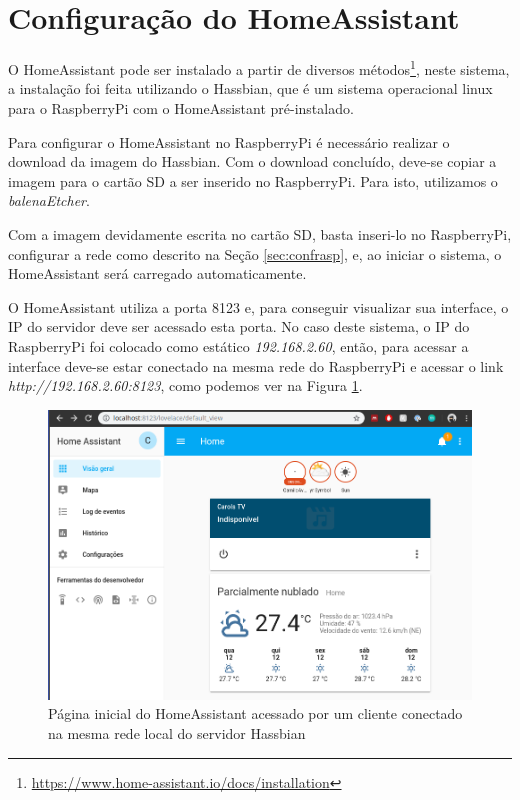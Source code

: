 \newpage

\section{Configuração do HomeAssistant}

O HomeAssistant pode ser instalado a partir de diversos métodos\footnote{\url{https://www.home-assistant.io/docs/installation}}, neste sistema, a instalação foi feita utilizando o Hassbian, que é um sistema operacional linux para o RaspberryPi com o HomeAssistant pré-instalado.

Para configurar o HomeAssistant no RaspberryPi é necessário realizar o download da imagem do Hassbian. Com o download concluído, deve-se copiar a imagem para o cartão SD a ser inserido no RaspberryPi. Para isto, utilizamos o \textit{balenaEtcher}.

Com a imagem devidamente escrita no cartão SD, basta inseri-lo no RaspberryPi, configurar a rede como descrito na Seção \ref{sec:confrasp}, e, ao iniciar o sistema, o HomeAssistant será carregado automaticamente.

O HomeAssistant utiliza a porta 8123 e, para conseguir visualizar sua interface, o IP do servidor deve ser acessado esta porta. No caso deste sistema, o IP do RaspberryPi foi colocado como estático \textit{192.168.2.60}, então, para acessar a interface deve-se estar conectado na mesma rede do RaspberryPi e acessar o link \textit{http://192.168.2.60:8123}, como podemos ver na Figura \ref{fig:homeassistanthome}.

\begin{figure}[htbp]
	\centering
	\includegraphics[width=1\linewidth]{figuras/homeassistanthome.png}
	\caption{Página inicial do HomeAssistant acessado por um cliente conectado na mesma rede local do servidor Hassbian}
	\label{fig:homeassistanthome}
\end{figure}

